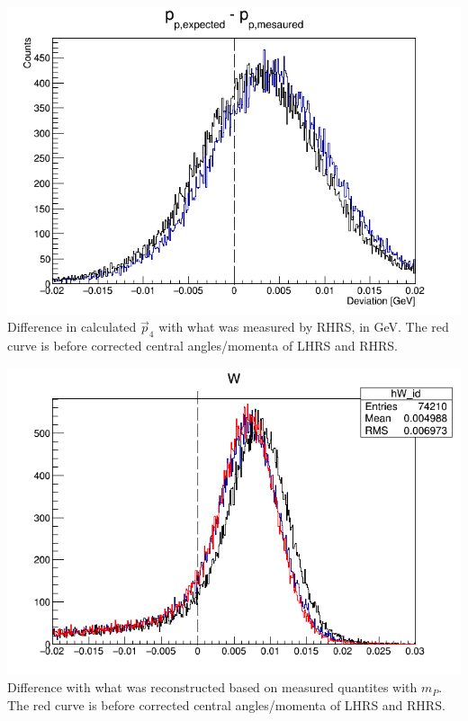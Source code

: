 \documentclass{article}
\begin{document}
\begin{center}
\includegraphics[width=14cm]{delPp.png}\\
Difference in calculated $\vec{p}_4$ with what was measured by RHRS, in GeV. The red curve is before corrected central angles/momenta of LHRS and RHRS.
\end{center}

\begin{center}
\includegraphics[width=14cm]{delW.png}\\
Difference with what was reconstructed based on measured quantites with $m_P$. The red curve is before corrected central angles/momenta of LHRS and RHRS.
\end{center}

\clearpage
\end{document}
